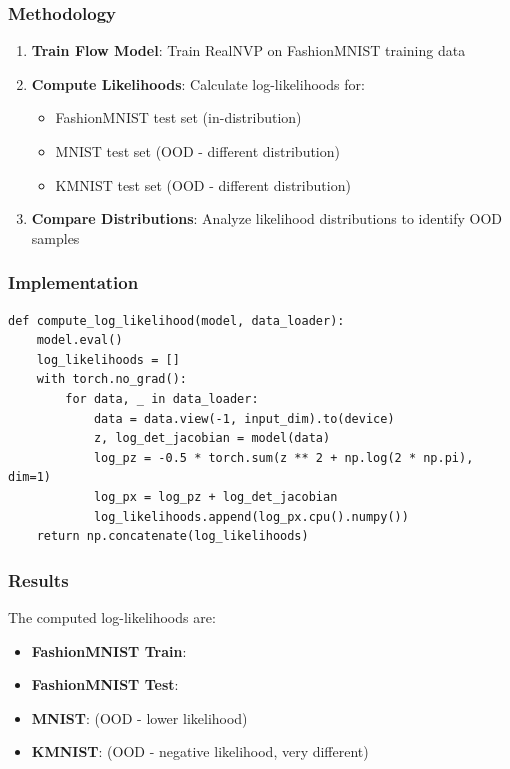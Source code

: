 \documentclass[conference,12pt]{IEEEtran}
\begin{document}
\subsubsection{Methodology}

\begin{enumerate}
    \item \textbf{Train Flow Model}: Train RealNVP on FashionMNIST training data
    \item \textbf{Compute Likelihoods}: Calculate log-likelihoods for:
    \begin{itemize}
        \item FashionMNIST test set (in-distribution)
        \item MNIST test set (OOD - different distribution)
        \item KMNIST test set (OOD - different distribution)
    \end{itemize}
    \item \textbf{Compare Distributions}: Analyze likelihood distributions to identify OOD samples
\end{enumerate}

\subsubsection{Implementation}

\begin{lstlisting}[caption={Log-Likelihood Computation for OOD Detection}]
def compute_log_likelihood(model, data_loader):
    model.eval()
    log_likelihoods = []
    with torch.no_grad():
        for data, _ in data_loader:
            data = data.view(-1, input_dim).to(device)
            z, log_det_jacobian = model(data)
            log_pz = -0.5 * torch.sum(z ** 2 + np.log(2 * np.pi), dim=1)
            log_px = log_pz + log_det_jacobian
            log_likelihoods.append(log_px.cpu().numpy())
    return np.concatenate(log_likelihoods)
\end{lstlisting}

\subsubsection{Results}

The computed log-likelihoods are:

\begin{itemize}
    \item \textbf{FashionMNIST Train}: \PixelTrainLL
    \item \textbf{FashionMNIST Test}: \PixelTestLL
    \item \textbf{MNIST}: \PixelMNISTLL{} (OOD - lower likelihood)
    \item \textbf{KMNIST}: \PixelKMNISTLL{} (OOD - negative likelihood, very different)
\end{itemize}
\end{document}
